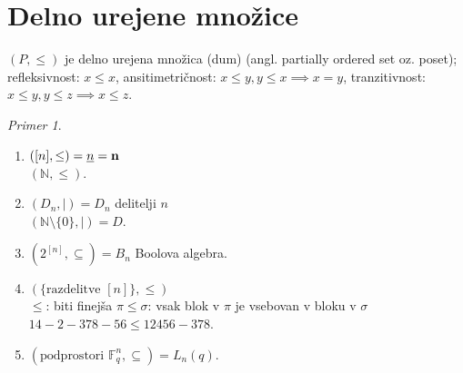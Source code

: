 \documentclass[a4paper, 12pt]{book}
\theoremstyle{definition}
\theoremstyle{remark}
\newtheorem*{ex}{Primer}
\newcommand{\N}{\mathbb{N}}
\newcommand{\F}{\mathbb{F}}
\begin{document}
\section{Delno urejene množice}

$(P, \leq)$ je delno urejena množica (dum) (angl. partially ordered set oz. poset); \\
refleksivnost: $x \leq x$, ansitimetričnost: $x \leq y, y \leq x \implies x = y$,
tranzitivnost: $x \leq y, y \leq z \implies x \leq z$.
\begin{ex} \text{} \\
  \begin{enumerate}[label=(\arabic*)]
    \item $([n], \leq) = \underline{n} = \bf{n}$ \\
      $(\N, \leq)$.
    \item $(D_n, |) = D_n$ delitelji $n$ \\
      $(\N \setminus \{0\}, |) = D$.
    \item $(2^{[n]}, \subseteq) = B_n$ Boolova algebra.
    \item $(\{\text{razdelitve } [n]\}, \leq)$ \\
      $\leq$: biti finejša
      $\pi \leq \sigma$: vsak blok v $\pi$ je vsebovan v bloku v $\sigma$ \\
      $14-2-378-56 \leq 12456-378$.
    \item $(\text{podprostori } \F_q^n, \subseteq) = L_n(q)$.
  \end{enumerate}
\end{ex}


\end{document}
